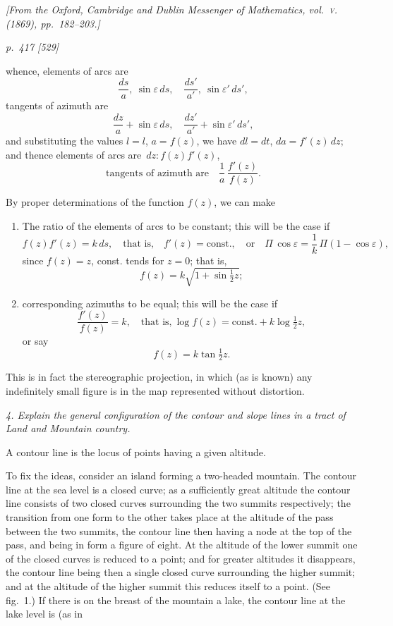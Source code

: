\documentclass[11pt,a4paper]{book}
\begin{document}
\begin{center}
\textit{[From the Oxford, Cambridge and Dublin Messenger of Mathematics, vol.~\textsc{v}. (1869), pp.~182--203.]}
\end{center}

\bigskip
\textit{p.~417 [529]}
\smallskip

\noindent
whence, elements of arcs are
\[
\frac{ds}{a},\ \sin\varepsilon\,ds, \quad \frac{ds'}{a'},\ \sin\varepsilon'\,ds',
\]
tangents of azimuth are
\[
\frac{dz}{a} + \sin\varepsilon\,ds, \quad \frac{dz'}{a'} + \sin\varepsilon'\,ds',
\]
and substituting the values $l = l$, $a = f(z)$, we have $dl = dt$, $da = f'(z)\,dz$; and thence
elements of arcs are $\,dz : f(z)f'(z)$,
\[
\text{tangents of azimuth are}\quad \frac{1}{a}\,\frac{f'(z)}{f(z)}.
\]

By proper determinations of the function $f(z)$, we can make

\begin{enumerate}[label=(\arabic*)]
\item The ratio of the elements of arcs to be constant; this will be the case if
\[
f(z)f'(z) = k\,ds, \quad \text{that is,}\quad f'(z) = \text{const.}, \quad \text{or}\quad \Pi\,\cos\varepsilon = \frac{1}{k}\,\Pi(1 - \cos\varepsilon),
\]
since $f(z) = z$, const. tends for $z = 0$; that is,
\[
f(z) = k\sqrt{1 + \sin\tfrac{1}{2}z};
\]
\item corresponding azimuths to be equal; this will be the case if
\[
\frac{f'(z)}{f(z)} = k, \quad \text{that is,}\ \log f(z) = \text{const.} + k \log\tfrac{1}{2}z,
\]
or say
\[
f(z) = k \tan\tfrac{1}{2}z.
\]
\end{enumerate}

This is in fact the stereographic projection, in which (as is known) any indefinitely small figure is in the map represented without distortion.

\textit{4. Explain the general configuration of the contour and slope lines in a tract of Land and Mountain country.}

A contour line is the locus of points having a given altitude.

To fix the ideas, consider an island forming a two-headed mountain. The contour line at the sea level is a closed curve; as a sufficiently great altitude the contour line consists of two closed curves surrounding the two summits respectively; the transition from one form to the other takes place at the altitude of the pass between the two summits, the contour line then having a node at the top of the pass, and being in form a figure of eight. At the altitude of the lower summit one of the closed curves is reduced to a point; and for greater altitudes it disappears, the contour line being then a single closed curve surrounding the higher summit; and at the altitude of the higher summit this reduces itself to a point. (See fig.~1.) If there is on the breast of the mountain a lake, the contour line at the lake level is (as in
\end{document}

